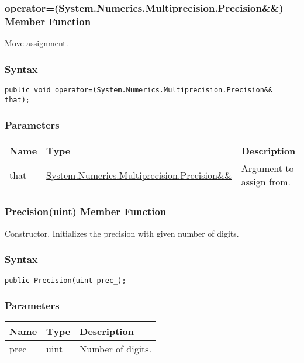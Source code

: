 \documentclass[a4paper,oneside,11.000000pt]{book}
\begin{document}
\hypertarget{System.Numerics.Multiprecision.Precision.operator.assign.P.System.Numerics.Multiprecision.Precision.RR.System.Numerics.Multiprecision.Precision}{\subsubsection*{operator=(System.Numerics.Multiprecision.Precision\&\&) Member Function}}\begin{flushleft}
Move assignment.

\end{flushleft}
\subsubsection*{Syntax}
\texttt{public void operator=(System.Numerics.Multiprecision.Precision\&\& that);}
\subsubsection*{Parameters}
\begin{flushleft}
\begin{supertabular}[l]{!{\raggedright}p{1.30721cm}!{\raggedright}p{8.55945cm}!{\raggedright}p{4.93333cm}}
\textbf{Name}
& \textbf{Type}
& \textbf{Description}
\\
\hline
that
& \hyperlink{System.Numerics.Multiprecision.Precision}{System.\-Numerics.\-Multiprecision.\-Precision\&\-\&\-}
& Argument to assign from.

\\
\end{supertabular}

\end{flushleft}
\clearpage

\hypertarget{System.Numerics.Multiprecision.Precision.constructor.P.System.Numerics.Multiprecision.Precision.uint}{\subsubsection*{Precision(uint) Member Function}}
\begin{flushleft}
Constructor. Initializes the precision with given number of digits.

\end{flushleft}
\subsubsection*{Syntax}\texttt{public Precision(uint prec\_);}

\subsubsection*{Parameters}
\begin{flushleft}
\begin{supertabular}[l]{lll}
\textbf{Name}
& \textbf{Type}
& \textbf{Description}
\\
\hline
prec\_
& uint
& Number of digits.

\\
\end{supertabular}

\end{flushleft}
\clearpage
\end{document}

